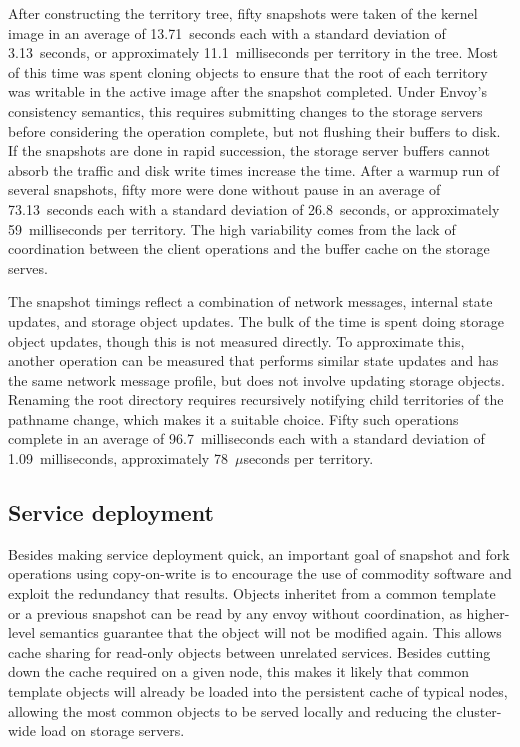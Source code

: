 After constructing the territory tree, fifty snapshots were taken of the kernel image in an average of 13.71~seconds each with a standard deviation of 3.13~seconds, or approximately 11.1~milliseconds per territory in the tree. Most of this time was spent cloning objects to ensure that the root of each territory was writable in the active image after the snapshot completed. Under Envoy's consistency semantics, this requires submitting changes to the storage servers before considering the operation complete, but not flushing their buffers to disk. If the snapshots are done in rapid succession, the storage server buffers cannot absorb the traffic and disk write times increase the time. After a warmup run of several snapshots, fifty more were done without pause in an average of 73.13~seconds each with a standard deviation of 26.8~seconds, or approximately 59~milliseconds per territory. The high variability comes from the lack of coordination between the client operations and the buffer cache on the storage serves.

The snapshot timings reflect a combination of network messages, internal state updates, and storage object updates. The bulk of the time is spent doing storage object updates, though this is not measured directly. To approximate this, another operation can be measured that performs similar state updates and has the same network message profile, but does not involve updating storage objects. Renaming the root directory requires recursively notifying child territories of the pathname change, which makes it a suitable choice. Fifty such operations complete in an average of 96.7~milliseconds each with a standard deviation of 1.09~milliseconds, approximately 78~$\mu$seconds per territory.

\subsection{Service deployment}

Besides making service deployment quick, an important goal of snapshot and fork operations using copy-on-write is to encourage the use of commodity software and exploit the redundancy that results. Objects inheritet from a common template or a previous snapshot can be read by any envoy without coordination, as higher-level semantics guarantee that the object will not be modified again. This allows cache sharing for read-only objects between unrelated services. Besides cutting down the cache required on a given node, this makes it likely that common template objects will already be loaded into the persistent cache of typical nodes, allowing the most common objects to be served locally and reducing the cluster-wide load on storage servers.


